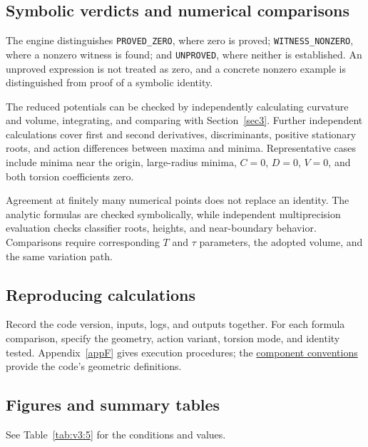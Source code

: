 \subsection{Symbolic verdicts and numerical comparisons}
The engine distinguishes \texttt{PROVED\_ZERO}, where zero is proved;
\texttt{WITNESS\_NONZERO}, where a nonzero witness is found; and
\texttt{UNPROVED}, where neither is established.
An unproved expression is not treated as zero, and a concrete nonzero
example is distinguished from proof of a symbolic identity.

The reduced potentials can be checked by independently calculating
curvature and volume, integrating, and comparing with
Section~\ref{sec3}. Further independent calculations cover first and
second derivatives, discriminants, positive stationary roots, and
action differences between maxima and minima.
Representative cases include minima near the origin, large-radius
minima, $C=0$, $D=0$, $V=0$, and both torsion coefficients zero.

Agreement at finitely many numerical points does not replace an identity.
The analytic formulas are checked symbolically, while independent
multiprecision evaluation checks classifier roots, heights, and
near-boundary behavior.
Comparisons require corresponding $T$ and $\tau$ parameters, the adopted
volume, and the same variation path.

\subsection{Reproducing calculations}
Record the code version, inputs, logs, and outputs together.
For each formula comparison, specify the geometry, action variant,
torsion mode, and identity tested.
Appendix~\ref{appF} gives execution procedures; the
\href{https://github.com/Muacca/DPPUv2-paper01/blob/main/script/docs/CONVENTIONS_ja.md}{component conventions}
provide the code's geometric definitions.

\subsection{Figures and summary tables}
See Table~\ref{tab:v3:5} for the conditions and values.


\FloatBarrier
